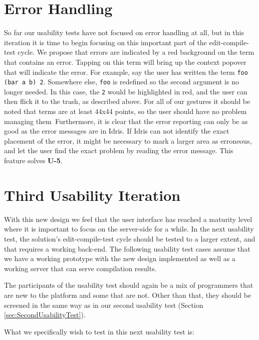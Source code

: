 \section{Error Handling}
\label{subsec:error_handling}
So far our usability tests have not focused on error handling at all, but in this iteration it is time to begin focusing on this important part of the edit-compile-test cycle.
We propose that errors are indicated by a red background on the term that contains an error. 
Tapping on this term will bring up the context popover that will indicate the error.
For example, say the user has written the term \texttt{foo (bar a b) 2}.
Somewhere else, \texttt{foo} is redefined so the second argument is no longer needed.
In this case, the \texttt{2} would be highlighted in red, and the user can then flick it to the trash, as described above.
For all of our gestures it should be noted that terms are at least 44x44
points, so the user should have no problem managing them\,\cite[p. 30]{mobileHIG}
Furthermore, it is clear that the error reporting can only be as good as the error messages are in Idris.
If Idris can not identify the exact placement of the error, it might be necessary to mark a larger area as erroneous, and let the user find the exact problem by reading the error message.
This feature solves \textbf{U-5}.

\section{Third Usability Iteration}
\label{subsec:third_usability_test}
With this new design we feel that the user interface has reached a maturity
level where it is important to focus on the server-side for a while. In the
next usability test, the solution's edit-compile-test cycle should be tested to
a larger extent, and that requires a working back-end. The following usability
test cases assume that we have a working prototype with the new design
implemented as well as a working server that can serve compilation results.

The participants of the usability test should again be a mix of programmers
that are new to the platform and some that are not. Other than that, they
should be screened in the same way as in our second usability test (Section
\ref{sec:SecondUsabilityTest}).

What we specifically wish to test in this next usability test is:

